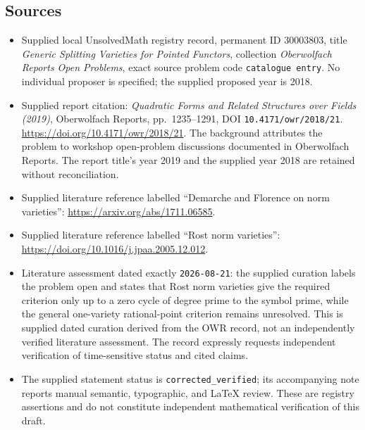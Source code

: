 \documentclass[11pt]{article}
\begin{document}
\subsection{Sources}
\begin{itemize}
\item Supplied local UnsolvedMath registry record, permanent ID \(30003803\), title \emph{Generic Splitting Varieties for Pointed Functors}, collection \emph{Oberwolfach Reports Open Problems}, exact source problem code \texttt{catalogue entry}. No individual proposer is specified; the supplied proposed year is 2018.
\item Supplied report citation: \emph{Quadratic Forms and Related Structures over Fields (2019)}, Oberwolfach Reports, pp.\ 1235--1291, DOI \texttt{10.4171/owr/2018/21}. \url{https://doi.org/10.4171/owr/2018/21}. The background attributes the problem to workshop open-problem discussions documented in Oberwolfach Reports. The report title's year 2019 and the supplied year 2018 are retained without reconciliation.
\item Supplied literature reference labelled ``Demarche and Florence on norm varieties'': \url{https://arxiv.org/abs/1711.06585}.
\item Supplied literature reference labelled ``Rost norm varieties'': \url{https://doi.org/10.1016/j.jpaa.2005.12.012}.
\item Literature assessment dated exactly \texttt{2026-08-21}: the supplied curation labels the problem open and states that Rost norm varieties give the required criterion only up to a zero cycle of degree prime to the symbol prime, while the general one-variety rational-point criterion remains unresolved. This is supplied dated curation derived from the OWR record, not an independently verified literature assessment. The record expressly requests independent verification of time-sensitive status and cited claims.
\item The supplied statement status is \texttt{corrected\_verified}; its accompanying note reports manual semantic, typographic, and LaTeX review. These are registry assertions and do not constitute independent mathematical verification of this draft.
\end{itemize}
\end{document}
